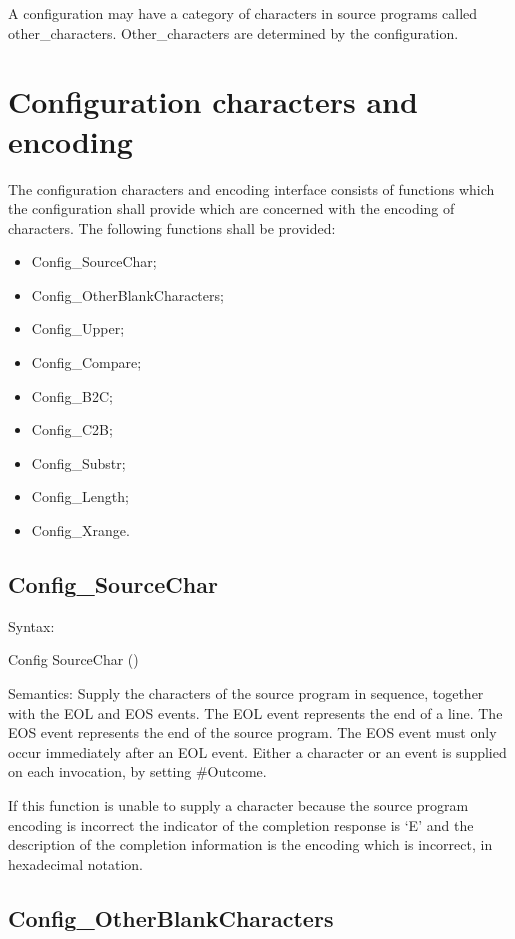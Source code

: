 A configuration may have a category of characters in source programs
called other\_characters. Other\_characters are determined by the
configuration.

\section{Configuration characters and
encoding}\label{configuration-characters-and-encoding}

The configuration characters and encoding interface consists of
functions which the configuration shall provide which are concerned with
the encoding of characters. The following functions shall be provided:

\begin{itemize}
\item
  Config\_SourceChar;
\item
  Config\_OtherBlankCharacters;
\item
  Config\_Upper;
\item
  Config\_Compare;
\item
  Config\_B2C;
\item
  Config\_C2B;
\item
  Config\_Substr;
\item
  Config\_Length;
\item
  Config\_Xrange.
\end{itemize}

\subsection{Config\_SourceChar}\label{config_sourcechar}

Syntax:

Config SourceChar ()

Semantics: Supply the characters of the source program in sequence,
together with the EOL and EOS events. The EOL event represents the end
of a line. The EOS event represents the end of the source program. The
EOS event must only occur immediately after an EOL event. Either a
character or an event is supplied on each invocation, by setting
\#Outcome.

If this function is unable to supply a character because the source
program encoding is incorrect the indicator of the completion response
is `E' and the description of the completion information is the encoding
which is incorrect, in hexadecimal notation.

\subsection{Config\_OtherBlankCharacters}\label{config_otherblankcharacters}

